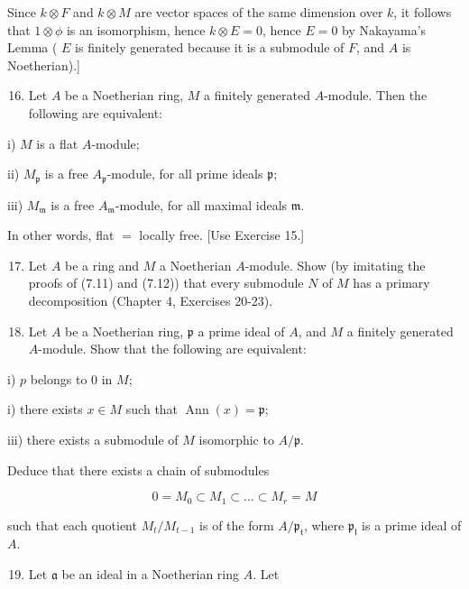 \documentclass{standalone}
\theoremstyle{definition}
\theoremstyle{remark}
\begin{document}
Since $k \otimes F$ and $k \otimes M$ are vector spaces of the same dimension over $k$, it follows that $1 \otimes \phi$ is an isomorphism, hence $k \otimes E=0$, hence $E=0$ by Nakayama's Lemma ( $E$ is finitely generated because it is a submodule of $F$, and $A$ is Noetherian).]

\begin{enumerate}
  \setcounter{enumi}{15}
  \item Let $A$ be a Noetherian ring, $M$ a finitely generated $A$-module. Then the following are equivalent:
\end{enumerate}

i) $M$ is a flat $A$-module;

ii) $M_{\mathfrak{p}}$ is a free $A_{\mathfrak{p}}$-module, for all prime ideals $\mathfrak{p}$;

iii) $M_{\mathfrak{m}}$ is a free $A_{\mathfrak{m}}$-module, for all maximal ideals $\mathfrak{m}$.

In other words, flat $=$ locally free. [Use Exercise 15.]

\begin{enumerate}
  \setcounter{enumi}{16}
  \item Let $A$ be a ring and $M$ a Noetherian $A$-module. Show (by imitating the proofs of (7.11) and (7.12)) that every submodule $N$ of $M$ has a primary decomposition (Chapter 4, Exercises 20-23).

  \item Let $A$ be a Noetherian ring, $\mathfrak{p}$ a prime ideal of $A$, and $M$ a finitely generated $A$-module. Show that the following are equivalent:

\end{enumerate}

i) $p$ belongs to 0 in $M$;

i) there exists $x \in M$ such that $\operatorname{Ann}(x)=\mathfrak{p}$;

iii) there exists a submodule of $M$ isomorphic to $A / \mathfrak{p}$.

Deduce that there exists a chain of submodules

\[
0=M_{0} \subset M_{1} \subset \ldots \subset M_{r}=M
\]

such that each quotient $M_{t} / M_{t-1}$ is of the form $A / \mathfrak{p}_{\mathfrak{t}}$, where $\mathfrak{p}_{\mathfrak{l}}$ is a prime ideal of $A$.

\begin{enumerate}
  \setcounter{enumi}{18}
  \item Let $\mathfrak{a}$ be an ideal in a Noetherian ring $A$. Let
\end{enumerate}
\end{document}
